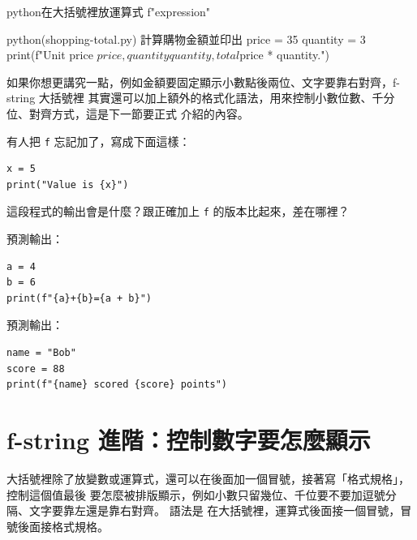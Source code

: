 \begin{code}{python}{在大括號裡放運算式}
f"{expression}"
\end{code}

\begin{example}{python}{(shopping-total.py) 計算購物金額並印出}
price = 35
quantity = 3
print(f"Unit price ${price}, quantity {quantity}, total ${price * quantity}.")
\end{example}



如果你想更講究一點，例如金額要固定顯示小數點後兩位、文字要靠右對齊，f-string 大括號裡
其實還可以加上額外的格式化語法，用來控制小數位數、千分位、對齊方式，這是下一節要正式
介紹的內容。

\begin{drills}[label=drills:f-string]
\item 有人把 \texttt{f} 忘記加了，寫成下面這樣：
\begin{verbatim}
x = 5
print("Value is {x}")
\end{verbatim}
這段程式的輸出會是什麼？跟正確加上 \texttt{f} 的版本比起來，差在哪裡？
\item 預測輸出：
\begin{verbatim}
a = 4
b = 6
print(f"{a}+{b}={a + b}")
\end{verbatim}
\item 預測輸出：
\begin{verbatim}
name = "Bob"
score = 88
print(f"{name} scored {score} points")
\end{verbatim}
\end{drills}

\section{f-string 進階：控制數字要怎麼顯示}
\label{sec:f-string-format}

大括號裡除了放變數或運算式，還可以在後面加一個冒號，接著寫「格式規格」，控制這個值最後
要怎麼被排版顯示，例如小數只留幾位、千位要不要加逗號分隔、文字要靠左還是靠右對齊。
語法是
在大括號裡，運算式後面接一個冒號，冒號後面接格式規格。

